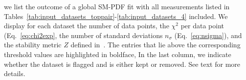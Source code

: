 \begin{table}[htbp]
\begin{center}
{{     we list the outcome of a global SM-PDF fit with all
     measurements listed in
     Tables~\ref{tab:input_datasets_toppair}-\ref{tab:input_datasets_4}
     included.
     We display for each dataset the  number of
data points, the $\chi^2$ per data point (Eq.~\eqref{eq:chi2exp}, the number of
standard deviations $n_\sigma$ (Eq.~\eqref{eq:nsigma}), and the
stability metric $Z$  defined in~\cite{Kassabov:2022pps}.
%
The entries that lie above the corresponding threshold values
are  highlighted in boldface,
%
In the
last column, we indicate whether the dataset is flagged and
is either kept or removed.
%
See text for more details.
   \label{tab:datasets_selection_atlas}
}
}
\end{center}
\end{table}

